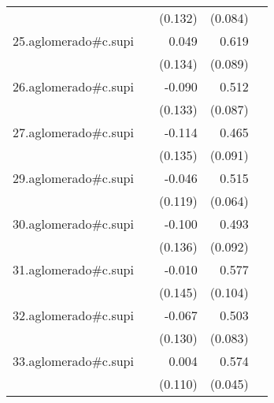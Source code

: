 {\begin{longtable}{l*{4}{D{.}{.}{-1}}}
            &                     &     (0.132)         &     (0.084)         &                     \\
\addlinespace
25.aglomerado#c.supi&                     &       0.049         &       0.619\sym{***}&                     \\
            &                     &     (0.134)         &     (0.089)         &                     \\
\addlinespace
26.aglomerado#c.supi&                     &      -0.090         &       0.512\sym{***}&                     \\
            &                     &     (0.133)         &     (0.087)         &                     \\
\addlinespace
27.aglomerado#c.supi&                     &      -0.114         &       0.465\sym{***}&                     \\
            &                     &     (0.135)         &     (0.091)         &                     \\
\addlinespace
29.aglomerado#c.supi&                     &      -0.046         &       0.515\sym{***}&                     \\
            &                     &     (0.119)         &     (0.064)         &                     \\
\addlinespace
30.aglomerado#c.supi&                     &      -0.100         &       0.493\sym{***}&                     \\
            &                     &     (0.136)         &     (0.092)         &                     \\
\addlinespace
31.aglomerado#c.supi&                     &      -0.010         &       0.577\sym{***}&                     \\
            &                     &     (0.145)         &     (0.104)         &                     \\
\addlinespace
32.aglomerado#c.supi&                     &      -0.067         &       0.503\sym{***}&                     \\
            &                     &     (0.130)         &     (0.083)         &                     \\
\addlinespace
33.aglomerado#c.supi&                     &       0.004         &       0.574\sym{***}&                     \\
            &                     &     (0.110)         &     (0.045)         &                     \\

\end{longtable}}
